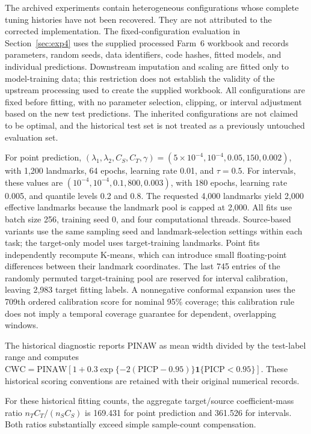 {\color{blue}The archived experiments contain heterogeneous configurations whose complete tuning histories have not been recovered. They are not attributed to the corrected implementation. The fixed-configuration evaluation in Section~\ref{sec:exp4} uses the supplied processed Farm~6 workbook and records parameters, random seeds, data identifiers, code hashes, fitted models, and individual predictions. Downstream imputation and scaling are fitted only to model-training data; this restriction does not establish the validity of the upstream processing used to create the supplied workbook. All configurations are fixed before fitting, with no parameter selection, clipping, or interval adjustment based on the new test predictions. The inherited configurations are not claimed to be optimal, and the historical test set is not treated as a previously untouched evaluation set.}

{\color{blue}For point prediction, $(\lambda_1,\lambda_2,C_S,C_T,\gamma)=(5\times10^{-4},10^{-4},0.05,150,0.002)$, with 1,200 landmarks, 64 epochs, learning rate 0.01, and $\tau=0.5$. For intervals, these values are $(10^{-4},10^{-4},0.1,800,0.003)$, with 180 epochs, learning rate 0.005, and quantile levels 0.2 and 0.8. The requested 4,000 landmarks yield 2,000 effective landmarks because the landmark pool is capped at 2,000. All fits use batch size 256, training seed 0, and four computational threads. Source-based variants use the same sampling seed and landmark-selection settings within each task; the target-only model uses target-training landmarks. Point fits independently recompute K-means, which can introduce small floating-point differences between their landmark coordinates. The last 745 entries of the randomly permuted target-training pool are reserved for interval calibration, leaving 2,983 target fitting labels. A nonnegative conformal expansion uses the 709th ordered calibration score for nominal 95\% coverage; this calibration rule does not imply a temporal coverage guarantee for dependent, overlapping windows.}

{\color{blue}The historical diagnostic reports PINAW as mean width divided by the test-label range and computes $\mathrm{CWC}=\mathrm{PINAW}[1+0.3\exp\{-2(\mathrm{PICP}-0.95)\}\mathbf1\{\mathrm{PICP}<0.95\}]$. These historical scoring conventions are retained with their original numerical records.}

{\color{blue}For these historical fitting counts, the aggregate target/source coefficient-mass ratio $n_TC_T/(n_SC_S)$ is 169.431 for point prediction and 361.526 for intervals. Both ratios substantially exceed simple sample-count compensation.}

